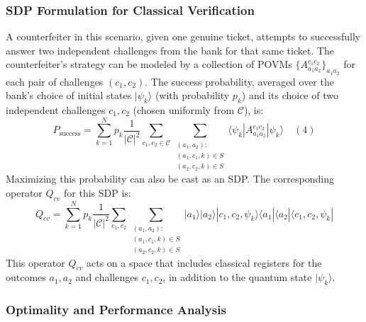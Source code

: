 \documentclass{article} %
\begin{document}
\subsubsection{SDP Formulation for Classical Verification}
A counterfeiter in this scenario, given one genuine ticket, attempts to successfully answer two independent challenges from the bank for that same ticket. The counterfeiter's strategy can be modeled by a collection of POVMs $\{A_{a_1a_2}^{c_1c_2}\}_{a_1a_2}$ for each pair of challenges $(c_1, c_2)$. The success probability, averaged over the bank's choice of initial states $|\psi_k\rangle$ (with probability $p_k$) and its choice of two independent challenges $c_1, c_2$ (chosen uniformly from $\mathcal{C}$), is:
$$ P_{\text{success}} = \sum_{k=1}^{N} p_k \frac{1}{|\mathcal{C}|^2} \sum_{c_1, c_2 \in \mathcal{C}} \sum_{\substack{(a_1,a_2): \\ (a_1,c_1,k)\in S \\ (a_2,c_2,k)\in S}} \langle \psi_k | A_{a_1a_2}^{c_1c_2} | \psi_k \rangle \quad (4) $$
Maximizing this probability can also be cast as an SDP. The corresponding operator $Q_{cv}$ for this SDP is:
$$ Q_{cv} = \sum_{k=1}^{N} p_k \frac{1}{|\mathcal{C}|^2} \sum_{c_1, c_2} \sum_{\substack{(a_1,a_2): \\ (a_1,c_1,k)\in S \\ (a_2,c_2,k)\in S}} |a_1\rangle|a_2\rangle|c_1, c_2, \psi_k\rangle \langle a_1|\langle a_2|\langle c_1, c_2, \psi_k| $$
This operator $Q_{cv}$ acts on a space that includes classical registers for the outcomes $a_1, a_2$ and challenges $c_1, c_2$, in addition to the quantum state $|\psi_k\rangle$.

\subsubsection{Optimality and Performance Analysis}
\end{document}
